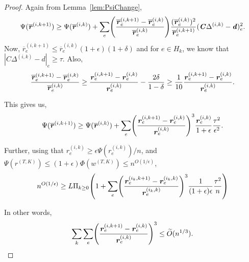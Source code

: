 \documentclass[11pt]{article}
\let\originalleft\left
\let\originalright\right
\renewcommand{\left}{\mathopen{}\mathclose\bgroup\originalleft}
\renewcommand{\right}{\aftergroup\egroup\originalright}
\newcommand\dd{\boldsymbol{\mathit{d}}}
\newcommand\rr{\boldsymbol{\mathit{r}}}
\newcommand\ww{\boldsymbol{\mathit{w}}}
\newcommand\rrbar{\overline{\boldsymbol{\mathit{r}}}}
\newcommand\CC{\boldsymbol{\mathit{C}}}
\begin{document}
\begin{proof}
Again from Lemma~\ref{lem:PsiChange},
\[
\Psi(\rrbar^{(i,k+1)})\geq \Psi(\rrbar^{(i,k)}) + \sum_e \left(\frac{\rrbar_e^{\left(i,k+1\right)}-\rrbar_e^{\left(i,k \right)}}{\rrbar_e^{\left(i,k\right)}} \right) \frac{(\rrbar_e^{(i,k)})^2}{\rrbar^{(i,k+1)}_e} (\CC\Delta^{(i,k)}-\dd)_e^2.
\]
Now, $\rrbar_e^{(i, k+1)}\leq \rrbar_e^{(i, k)}(1+\epsilon)(1+\delta)$ and for $e\in H_k$, we know that $|\CC\Delta^{(i,k)}-\dd|_e\geq \tau.$ Also, 
\[
\frac{\rrbar_e^{\left(i,k+1\right)}-\rrbar_e^{\left(i,k \right)}}{\rrbar_e^{\left(i,k \right)}} \geq \frac{\rr_e^{\left(i,k+1\right)}-\rr_e^{\left(i,k \right)}}{\rr_e^{\left(i,k \right)}} -\frac{2\delta}{1-\delta}\geq \frac{1}{10}\frac{\rr_e^{\left(i,k+1\right)}-\rr_e^{\left(i,k \right)}}{\rr_e^{\left(i,k \right)}}.
\]


This gives us,
\[
\Psi(\rrbar^{(i,k+1)})\geq \Psi(\rrbar^{(i,k)}) + \sum_e \left(\frac{\rr_e^{\left(i,k+1\right)}-\rr_e^{\left(i,k \right)}}{\rr_e^{\left(i,k\right)}} \right)^3 \frac{\rr_e^{(i,k)}}{1+\epsilon} \frac{\tau^2}{\epsilon^2}.
\]


Further, using that $\rr_e^{(i,k)}\geq \epsilon\Psi(\rr_e^{(i,k)})/n$, and $\Psi(\rr^{(T,K)})\leq (1+\epsilon)\Phi(\ww^{(T,K)}) \leq n^{O(1/\epsilon)}$,
\[
n^{O(1/\epsilon)}\geq L\Pi_{k\geq 0}\left(1+\sum_e \left(\frac{\rr_e^{\left(i_k,k+1\right)}-\rr_e^{\left(i_k,k \right)}}{\rr_e^{\left(i_k,k\right)}} \right)^3 \frac{1}{(1+\epsilon)\epsilon} \frac{\tau^2}{n}\right)
\]

In other words,
\[
\sum_k\sum_e \left(\frac{\rr_e^{\left(i,k+1\right)}-\rr_e^{\left(i,k \right)}}{\rr_e^{\left(i,k\right)}} \right)^3 \leq \widetilde{O} (n^{1/3}).
\]
\end{proof}
\end{document}
